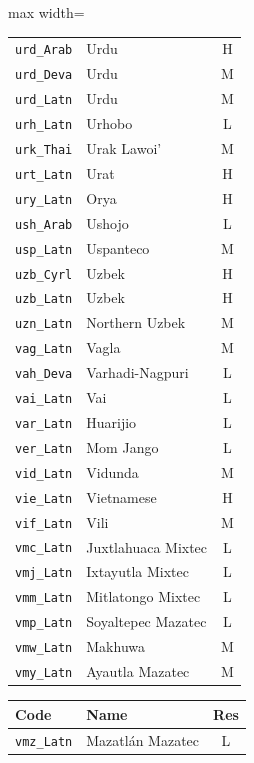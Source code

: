 {\begin{adjustbox}{max width=\textwidth}
\begin{tabular}{llc}
        \texttt{urd\_Arab} & Urdu & H \\
        \texttt{urd\_Deva} & Urdu & M \\
        \texttt{urd\_Latn} & Urdu & M \\
        \texttt{urh\_Latn} & Urhobo & L \\
        \texttt{urk\_Thai} & Urak Lawoi' & M \\
        \texttt{urt\_Latn} & Urat & H \\
        \texttt{ury\_Latn} & Orya & H \\
        \texttt{ush\_Arab} & Ushojo & L \\
        \texttt{usp\_Latn} & Uspanteco & M \\
        \texttt{uzb\_Cyrl} & Uzbek & H \\
        \texttt{uzb\_Latn} & Uzbek & H \\
        \texttt{uzn\_Latn} & Northern Uzbek & M \\
        \texttt{vag\_Latn} & Vagla & M \\
        \texttt{vah\_Deva} & Varhadi-Nagpuri & L \\
        \texttt{vai\_Latn} & Vai & L \\
        \texttt{var\_Latn} & Huarijio & L \\
        \texttt{ver\_Latn} & Mom Jango & L \\
        \texttt{vid\_Latn} & Vidunda & M \\
        \texttt{vie\_Latn} & Vietnamese & H \\
        \texttt{vif\_Latn} & Vili & M \\
        \texttt{vmc\_Latn} & Juxtlahuaca Mixtec & L \\
        \texttt{vmj\_Latn} & Ixtayutla Mixtec & L \\
        \texttt{vmm\_Latn} & Mitlatongo Mixtec & L \\
        \texttt{vmp\_Latn} & Soyaltepec Mazatec & L \\
        \texttt{vmw\_Latn} & Makhuwa & M \\
        \texttt{vmy\_Latn} & Ayautla Mazatec & M \\
        \bottomrule
    \end{tabular}
    \quad
    \begin{tabular}{llc}
        \toprule
        \textbf{Code} & \textbf{Name} & \textbf{Res}\\
        \midrule
        \texttt{vmz\_Latn} & Mazatlán Mazatec & L \\

\end{tabular}
\end{adjustbox}}
